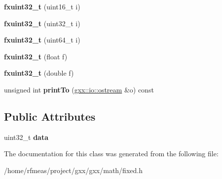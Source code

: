 \begin{DoxyCompactItemize}
\item 
{\bfseries fxuint32\+\_\+t} (uint16\+\_\+t i)\hypertarget{classfxuint32__t_a68c2d02691498f0eb55de875934c4f3d}{}\label{classfxuint32__t_a68c2d02691498f0eb55de875934c4f3d}

\item 
{\bfseries fxuint32\+\_\+t} (uint32\+\_\+t i)\hypertarget{classfxuint32__t_a20b9ed28744685cb9772c05a89863b9d}{}\label{classfxuint32__t_a20b9ed28744685cb9772c05a89863b9d}

\item 
{\bfseries fxuint32\+\_\+t} (uint64\+\_\+t i)\hypertarget{classfxuint32__t_aa4cd4392d44ffe6ecc33e49965384a46}{}\label{classfxuint32__t_aa4cd4392d44ffe6ecc33e49965384a46}

\item 
{\bfseries fxuint32\+\_\+t} (float f)\hypertarget{classfxuint32__t_ac1d0b756242117f5ffe695763f886246}{}\label{classfxuint32__t_ac1d0b756242117f5ffe695763f886246}

\item 
{\bfseries fxuint32\+\_\+t} (double f)\hypertarget{classfxuint32__t_a10e5eda394baba392a8c1634ef446864}{}\label{classfxuint32__t_a10e5eda394baba392a8c1634ef446864}

\item 
unsigned int {\bfseries print\+To} (\hyperlink{classgxx_1_1io_1_1ostream}{gxx\+::io\+::ostream} \&o) const \hypertarget{classfxuint32__t_af9de50e661e7693e2306df6c5c456021}{}\label{classfxuint32__t_af9de50e661e7693e2306df6c5c456021}

\end{DoxyCompactItemize}
\subsection*{Public Attributes}
\begin{DoxyCompactItemize}
\item 
uint32\+\_\+t {\bfseries data}\hypertarget{classfxuint32__t_ab922bb4dc2def601f296650928a9ae1e}{}\label{classfxuint32__t_ab922bb4dc2def601f296650928a9ae1e}

\end{DoxyCompactItemize}


The documentation for this class was generated from the following file\+:\begin{DoxyCompactItemize}
\item 
/home/rfmeas/project/gxx/gxx/math/fixed.\+h\end{DoxyCompactItemize}
